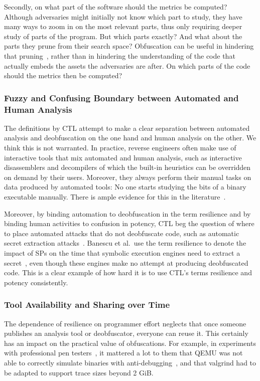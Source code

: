 Secondly, on what part of the software should the metrics be computed? Although adversaries might initially not know which part to study, they have many ways to zoom in on the most relevant parts, thus only requiring deeper study of parts of the program. But which parts exactly? And what about the parts they prune from their search space? Obfuscation can be useful in hindering that pruning~\cite{coppens2013feedback,reganoL2P}, rather than in hindering the understanding of the code that actually embeds the assets the adversaries are after. On which parts of the code should the metrics then be computed?

\subsubsection{Fuzzy and Confusing Boundary between Automated and Human Analysis}
\label{sec:fuzzy_boundary}
The definitions by CTL attempt to make a clear separation between automated analysis and deobfuscation on the one hand and human analysis on the other. We think this is not warranted. In practice, reverse engineers often make use of interactive tools that mix automated and human analysis, such as interactive disassemblers and decompilers of which the built-in heuristics can be overridden on demand by their users. Moreover, they always perform their manual tasks on data produced by automated tools: No one starts studying the bits of a binary executable manually. There is ample evidence for this in the literature~\cite{emse2019,Sutherland2006,Votipka2019,practice_malware,desutter2024evaluation}.

Moreover, by binding automation to deobfuscation in the term resilience and by binding human activities to confusion in potency, CTL beg the question of where to place automated attacks that do not deobfuscate code, such as automatic secret extraction attacks~\cite{khunt++,banescu15}. Banescu et al.\ use the term resilience to denote the impact of SPs on the time that symbolic execution engines need to extract a secret~\cite{banescu15,2017_predicting_the_resilience_of_obfuscated_code_against_symbolic_execution_attacks_via_machine_learning}, even though these engines make no attempt at producing deobfuscated code. This is a clear example of how hard it is to use CTL's terms resilience and potency consistently. 

\subsubsection{Tool Availability and Sharing over Time}
\label{sec:tool_availability}
The dependence of resilience on programmer effort neglects that once someone publishes an analysis tool or deobfuscator, everyone can reuse it. This certainly has an impact on the practical value of obfuscations. For example, in experiments with professional pen testers~\cite{emse2019}, it mattered a lot to them that QEMU was not able to correctly simulate binaries with anti-debugging~\cite{abrath2016tightly}, and that valgrind had to be adapted to support trace sizes beyond 2 GiB. 


